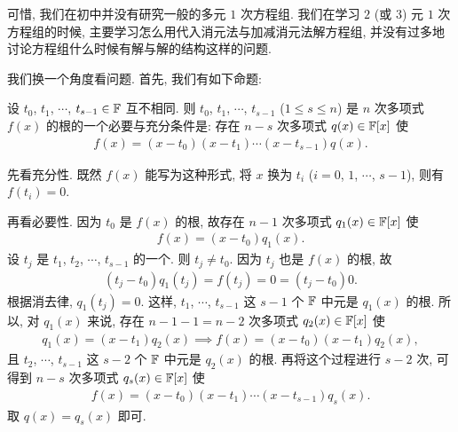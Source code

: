 可惜, 我们在初中并没有研究一般的多元 $1$ 次方程组. 我们在学习 $2$ (或 $3$) 元 $1$ 次方程组的时候, 主要学习怎么用代入消元法与加减消元法解方程组, 并没有过多地讨论方程组什么时候有解与解的结构这样的问题.

我们换一个角度看问题. 首先, 我们有如下命题:

\begin{proposition}
    设 $t_0$, $t_1$, $\cdots$, $t_{s-1} \in \mathbb{F}$ 互不相同. 则 $t_0$, $t_1$, $\cdots$, $t_{s-1}$ ($1 \leq s \leq n$) 是 $n$ 次多项式 $f(x)$ 的根的一个必要与充分条件是: 存在 $n-s$ 次多项式 $q(x) \in \mathbb{F}[x]$ 使
    \begin{align*}
        f(x) = (x - t_0)(x - t_1) \cdots (x-t_{s-1}) q(x).
    \end{align*}
\end{proposition}

\begin{pf}
    先看充分性. 既然 $f(x)$ 能写为这种形式, 将 $x$ 换为 $t_i$ ($i = 0$, $1$, $\cdots$, $s-1$), 则有 $f(t_i) = 0$.

    再看必要性. 因为 $t_0$ 是 $f(x)$ 的根, 故存在 $n-1$ 次多项式 $q_1 (x) \in \mathbb{F}[x]$ 使
    \begin{align*}
        f(x) = (x - t_0) q_1 (x).
    \end{align*}
    设 $t_j$ 是 $t_1$, $t_2$, $\cdots$, $t_{s-1}$ 的一个. 则 $t_j \neq t_0$. 因为 $t_j$ 也是 $f(x)$ 的根, 故
    \begin{align*}
        (t_j - t_0) q_1 (t_j) = f(t_j) = 0 = (t_j - t_0) 0.
    \end{align*}
    根据消去律, $q_1 (t_j) = 0$. 这样, $t_1$, $\cdots$, $t_{s-1}$ 这 $s-1$ 个 $\mathbb{F}$ 中元是 $q_1 (x)$ 的根. 所以, 对 $q_1 (x)$ 来说, 存在 $n-1-1 = n-2$ 次多项式 $q_2 (x) \in \mathbb{F}[x]$ 使
    \begin{align*}
        q_1 (x) = (x - t_1) q_2 (x) \implies f(x) = (x - t_0) (x - t_1) q_2 (x),
    \end{align*}
    且 $t_2$, $\cdots$, $t_{s-1}$ 这 $s-2$ 个 $\mathbb{F}$ 中元是 $q_2 (x)$ 的根. 再将这个过程进行 $s-2$ 次, 可得到 $n-s$ 次多项式 $q_s (x) \in \mathbb{F}[x]$ 使
    \begin{align*}
        f(x) = (x - t_0) (x - t_1) \cdots (x - t_{s-1}) q_s (x).
    \end{align*}
    取 $q(x) = q_s (x)$ 即可.
\end{pf}

